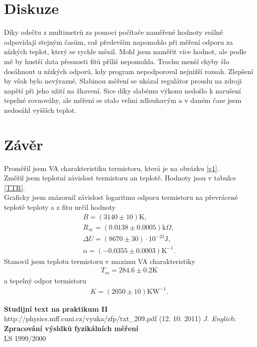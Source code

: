 \documentclass[a4paper,12pt]{article}
\begin{document}
\begin{figure}
\scalebox{0.7}{

}
\label{g3}
\end{figure}

\section{Diskuze}
Díky odečtu z multimetrů za pomoci počítače naměřené hodnoty reálně odpovídají stejným časům, což především napomohlo 
při měření odporu za nízkých teplot, který se rychle měnil. Mohl jsem naměřit více hodnot, ale podle mě by hustší data 
přesnosti fitů příliš nepomohla. Trochu menší chyby šlo dosáhnout u nízkých odporů, kdy program nepodporoval nejnižší rozsah. 
Zlepšení by však bylo nevýrazné. Slabinou měření se ukázal regulátor proudu na zdroji napětí při jeho užití na žhavení. 
Sice díky slabému výkonu nedošlo k narušení tepelné rovnováhy, ale měření se stalo velmi zdlouhavým a v daném čase jsem nedosáhl 
vyšších teplot.

\section{Závěr}
\noindent
Proměřil jsem VA charakteristiku termistoru, která je na obrázku \ref{g1}. \\
Změřil jsem teplotní závislost termistoru an teplotě. Hodnoty jsou v tabulce \ref{TTR}. \\
Graficky jsem znázornil závislost logaritmu odporu termistoru na převrácené teplotě teploty a z fitu určil hodnoty 
\begin{eqnarray}
B=(3140\pm 10) \mbox{K},\\
R_\infty=(0.0138\pm 0.0005) \mbox{k}\Omega,\\
\Delta U=(8670\pm30)\cdot10^{-23} \mbox{J},\\
\alpha=(-0.0355\pm0.0003)\mbox{K}^{-1}.
\end{eqnarray}
Stanovil jsem teplotu termistoru v maximu VA charakteristiky
\begin{eqnarray}
T_m=284.6\pm0.2 \mbox{K}
\end{eqnarray}
a tepelný odpor termistoru
\begin{eqnarray}
K=(2050\pm10)\mbox{KW}^{-1}.
\end{eqnarray}

\begin{thebibliography}{5}
	 \textbf{Studijní text na praktikum II} \\http://physics.mff.cuni.cz/vyuka/zfp/txt\_209.pdf (12. 10. 2011)
     \emph{J. Englich}: \textbf{Zpracování výsldků fyzikálních měření} \\ LS 1999/2000
\end{thebibliography}
\end{document}
